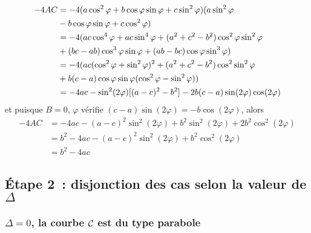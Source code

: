 \begin{align}
  -4AC& = -4(a\cos^2\varphi + b\cos\varphi\sin\varphi
  +c\sin^2\varphi)(a\sin^2\varphi \\
      &- b\cos\varphi\sin\varphi + c\cos^2\varphi) \notag\\
      & = -4(ac\cos^4\varphi + ac\sin^4\varphi + (a^2 +
      c^2 - b^2)\cos^2\varphi\sin^2\varphi\\
      & + (bc - ab)\cos^3\varphi\sin\varphi + (ab - bc)\cos\varphi\sin^3\varphi)
      \notag\\
      & = -4(ac(\cos^2\varphi + \sin^2\varphi)^2 + (a^2 + c^2 -
      b^2)\cos^2\sin^2\varphi \\
      & + b(c-a)\cos\varphi\sin\varphi(\cos^2\varphi-\sin^2\varphi)) \notag\\
      & = -4ac - \sin^2(2\varphi)[(a - c)^2 - b^2] - 2b(c -
      a)\sin(2\varphi)\cos(2\varphi)
\end{align}
et puisque \(B = 0\), \(\varphi\) vérifie
\((c - a)\sin(2\varphi) = -b\cos(2\varphi)\), alors
\begin{align}
  -4AC& = -4ac - (a - c)^2\sin^2(2\varphi) + b^2\sin^2(2\varphi) + 2b^2\cos^2(2\varphi)\\
      & = b^2 - 4ac - (a - c)^2\sin^2(2\varphi) + b^2\cos^2(2\varphi)\\
      & = b^2 - 4ac
\end{align}

\subsection{Étape 2~: disjonction des cas selon la valeur de \(\Delta\)}

\subsubsection{\(\Delta = 0\), la courbe \(\mathcal{C}_{{}}\) est du type parabole}

